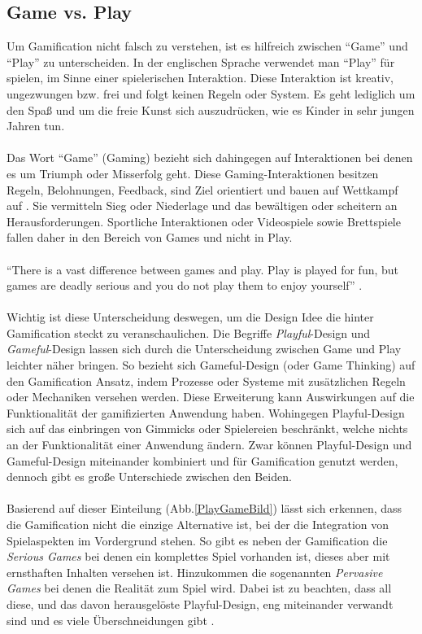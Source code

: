 \documentclass[a4paper,12pt]{scrartcl}
\begin{document}
\subsection{Game vs. Play}
Um Gamification nicht falsch zu verstehen, ist es hilfreich zwischen \enquote{Game} und \enquote{Play} zu unterscheiden. In der englischen Sprache verwendet man \enquote{Play} für spielen, im Sinne einer spielerischen Interaktion. Diese Interaktion ist kreativ, ungezwungen bzw. frei und folgt keinen Regeln oder System. Es geht lediglich um den Spaß und um die freie Kunst sich auszudrücken, wie es Kinder in sehr jungen Jahren tun.
\\\\
Das Wort \enquote{Game} (Gaming) bezieht sich dahingegen auf Interaktionen bei denen es um Triumph oder Misserfolg geht. Diese Gaming-Interaktionen besitzen Regeln, Belohnungen, Feedback, sind Ziel orientiert und bauen auf Wettkampf auf \cite{Deterding2011}. Sie vermitteln Sieg oder Niederlage und das bewältigen oder scheitern an Herausforderungen. Sportliche Interaktionen oder Videospiele sowie Brettspiele fallen daher in den Bereich von Games und nicht in Play. 
\\\\
\enquote{There is a vast difference between games and play. Play is played for fun, but games are deadly serious and you do not play them to enjoy yourself} \cite{Baring2014}.
\\\\
Wichtig ist diese Unterscheidung deswegen, um die Design Idee die hinter Gamification steckt zu veranschaulichen. Die Begriffe \textit{Playful}-Design und \textit{Gameful}-Design lassen sich durch die Unterscheidung zwischen Game und Play leichter näher bringen. So bezieht sich Gameful-Design (oder Game Thinking) auf den Gamification Ansatz, indem Prozesse oder Systeme mit zusätzlichen Regeln oder Mechaniken versehen werden. Diese Erweiterung kann Auswirkungen auf die Funktionalität der gamifizierten Anwendung haben. Wohingegen Playful-Design sich auf das einbringen von Gimmicks oder Spielereien beschränkt, welche nichts an der Funktionalität einer Anwendung ändern. Zwar können Playful-Design und Gameful-Design miteinander kombiniert und für Gamification genutzt werden, dennoch gibt es große Unterschiede zwischen den Beiden.
\\\\
Basierend auf dieser Einteilung (Abb.\ref{PlayGameBild}) lässt sich erkennen, dass die Gamification nicht die einzige Alternative ist, bei der die Integration von Spielaspekten im Vordergrund stehen. So gibt es neben der Gamification die \textit{Serious Games} bei denen ein komplettes Spiel vorhanden ist, dieses aber mit ernsthaften Inhalten versehen ist. Hinzukommen die sogenannten \textit{Pervasive Games} bei denen die Realität zum Spiel wird. Dabei ist zu beachten, dass all diese, und das davon herausgelöste Playful-Design, eng miteinander verwandt sind und es viele Überschneidungen gibt \cite{Deterding2011}.
\end{document}
